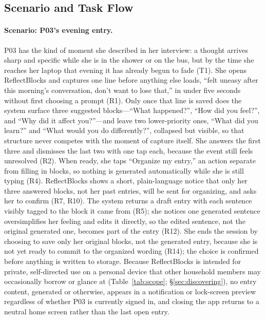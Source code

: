 \documentclass[sigconf,nonacm]{acmart}
\begin{document}
\subsection{Scenario and Task Flow}

\paragraph{Scenario: P03's evening entry.} P03 has the kind of moment she
described in her interview: a thought arrives sharp and specific while she is
in the shower or on the bus, but by the time she reaches her laptop that
evening it has already begun to fade (T1). She opens ReflectBlocks and
captures one line before anything else loads, ``felt uneasy after this
morning's conversation, don't want to lose that,'' in under five seconds
without first choosing a prompt (R1). Only once that line is saved does the
system surface three suggested blocks---``What happened?'', ``How did you
feel?'', and ``Why did it affect you?''---and leave two lower-priority ones,
``What did you learn?'' and ``What would you do differently?'', collapsed but
visible, so that structure never competes with the moment of capture itself.
She answers the first three and dismisses the last two with one tap each,
because the event still feels unresolved (R2). When ready, she taps
``Organize my entry,'' an action separate from filling in blocks, so nothing
is generated automatically while she is still typing (R4). ReflectBlocks
shows a short, plain-language notice that only her three answered blocks,
not her past entries, will be sent for organizing, and asks her to confirm
(R7, R10). The system returns a draft entry with each sentence visibly tagged
to the block it came from (R5); she notices one generated sentence
oversimplifies her feeling and edits it directly, so the edited sentence,
not the original generated one, becomes part of the entry (R12). She ends
the session by choosing to save only her original blocks, not the generated
entry, because she is not yet ready to commit to the organized wording (R14);
the choice is confirmed before anything is written to storage. Because
ReflectBlocks is intended for private, self-directed use on a personal device
that other household members may occasionally borrow or glance at
(Table~\ref{tab:scope}; \S\ref{sec:discovering}), no entry content, generated
or otherwise, appears in a notification or lock-screen preview regardless of
whether P03 is currently signed in, and closing the app returns to a neutral
home screen rather than the last open entry.
\end{document}
